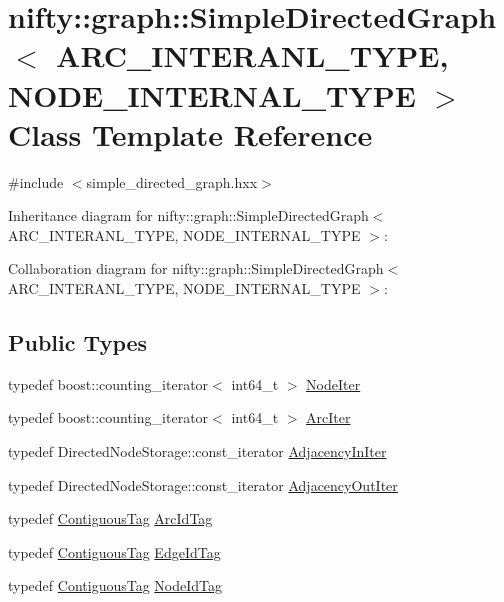 \hypertarget{classnifty_1_1graph_1_1SimpleDirectedGraph}{}\section{nifty\+:\+:graph\+:\+:Simple\+Directed\+Graph$<$ A\+R\+C\+\_\+\+I\+N\+T\+E\+R\+A\+N\+L\+\_\+\+T\+Y\+P\+E, N\+O\+D\+E\+\_\+\+I\+N\+T\+E\+R\+N\+A\+L\+\_\+\+T\+Y\+P\+E $>$ Class Template Reference}
\label{classnifty_1_1graph_1_1SimpleDirectedGraph}


{\ttfamily \#include $<$simple\+\_\+directed\+\_\+graph.\+hxx$>$}



Inheritance diagram for nifty\+:\+:graph\+:\+:Simple\+Directed\+Graph$<$ A\+R\+C\+\_\+\+I\+N\+T\+E\+R\+A\+N\+L\+\_\+\+T\+Y\+P\+E, N\+O\+D\+E\+\_\+\+I\+N\+T\+E\+R\+N\+A\+L\+\_\+\+T\+Y\+P\+E $>$\+:


Collaboration diagram for nifty\+:\+:graph\+:\+:Simple\+Directed\+Graph$<$ A\+R\+C\+\_\+\+I\+N\+T\+E\+R\+A\+N\+L\+\_\+\+T\+Y\+P\+E, N\+O\+D\+E\+\_\+\+I\+N\+T\+E\+R\+N\+A\+L\+\_\+\+T\+Y\+P\+E $>$\+:
\subsection*{Public Types}
\begin{DoxyCompactItemize}
\item 
typedef boost\+::counting\+\_\+iterator$<$ int64\+\_\+t $>$ \hyperlink{classnifty_1_1graph_1_1SimpleDirectedGraph_a50b05474da6846da32398e01be9e3d30}{Node\+Iter}
\item 
typedef boost\+::counting\+\_\+iterator$<$ int64\+\_\+t $>$ \hyperlink{classnifty_1_1graph_1_1SimpleDirectedGraph_ad555ff3a9746915c60858cd7d55ae342}{Arc\+Iter}
\item 
typedef Directed\+Node\+Storage\+::const\+\_\+iterator \hyperlink{classnifty_1_1graph_1_1SimpleDirectedGraph_aaf7f58391a2b6e0db7983462dbd6a542}{Adjacency\+In\+Iter}
\item 
typedef Directed\+Node\+Storage\+::const\+\_\+iterator \hyperlink{classnifty_1_1graph_1_1SimpleDirectedGraph_a5af7a4eb6bbc44b805a44bb131786dd0}{Adjacency\+Out\+Iter}
\item 
typedef \hyperlink{structnifty_1_1graph_1_1ContiguousTag}{Contiguous\+Tag} \hyperlink{classnifty_1_1graph_1_1SimpleDirectedGraph_a0e61985b1487d018ab09fcefb2302c99}{Arc\+Id\+Tag}
\item 
typedef \hyperlink{structnifty_1_1graph_1_1ContiguousTag}{Contiguous\+Tag} \hyperlink{classnifty_1_1graph_1_1SimpleDirectedGraph_ad0523e96e29a6feae5c9c003c2dc9e37}{Edge\+Id\+Tag}
\item 
typedef \hyperlink{structnifty_1_1graph_1_1ContiguousTag}{Contiguous\+Tag} \hyperlink{classnifty_1_1graph_1_1SimpleDirectedGraph_a32f9f0f4beaa2cada708f8a51189a96b}{Node\+Id\+Tag}
\end{DoxyCompactItemize}
